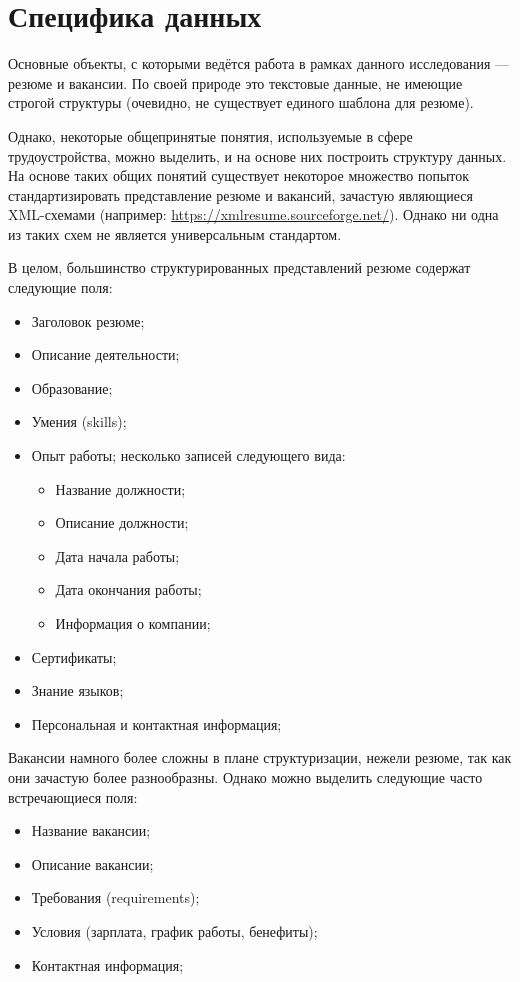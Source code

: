 \documentclass[14pt]{mmcs_article}
\begin{document}
\newpage
\section{Специфика данных}\label{data_specification}

Основные объекты, с которыми ведётся работа в рамках данного исследования --- резюме и вакансии. По своей природе это текстовые данные, не имеющие строгой структуры (очевидно, не существует единого шаблона для резюме).

Однако, некоторые общепринятые понятия, используемые в сфере трудоустройства, можно выделить, и на основе них построить структуру данных. На основе таких общих понятий существует некоторое множество попыток стандартизировать представление резюме и вакансий, зачастую являющиеся XML-схемами (например: \url{https://xmlresume.sourceforge.net/}). Однако ни одна из таких схем не является универсальным стандартом.

В целом, большинство структурированных представлений резюме содержат следующие поля:

\begin{itemize}
  \item Заголовок резюме;
  \item Описание деятельности;
  \item Образование;
  \item Умения (skills);
  \item Опыт работы; несколько записей следующего вида:
        \begin{itemize}
          \item Название должности;
          \item Описание должности;
          \item Дата начала работы;
          \item Дата окончания работы;
          \item Информация о компании;
        \end{itemize}
  \item Сертификаты;
  \item Знание языков;
  \item Персональная и контактная информация;
\end{itemize}

Вакансии намного более сложны в плане структуризации, нежели резюме, так как они зачастую более разнообразны. Однако можно выделить следующие часто встречающиеся поля:

\begin{itemize}
  \item Название вакансии;
  \item Описание вакансии;
  \item Требования (requirements);
  \item Условия (зарплата, график работы, бенефиты);
  \item Контактная информация;
\end{itemize}
\end{document}
